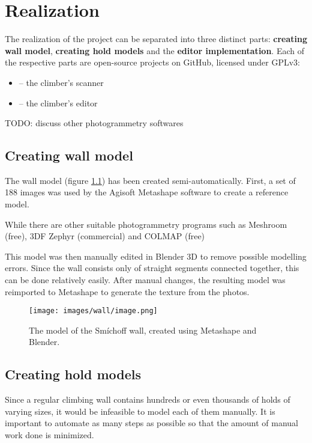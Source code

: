 \chapter{Realization}\label{sec:realization}

The realization of the project can be separated into three distinct parts: \textbf{creating wall model}, \textbf{creating hold models} and the \textbf{editor implementation}.
Each of the respective parts are open-source projects on GitHub, licensed under GPLv3:
\begin{itemize}
	\item \raisebox{-0.08em}{} -- the climber's scanner \cite{clis}
	\item \raisebox{-0.08em}{} -- the climber's editor \cite{cled}
\end{itemize}

TODO: discuss other photogrammetry softwares

\section{Creating wall model}
The wall model (figure \ref{fig:model}) has been created semi-automatically.
First, a set of 188 images was used by the Agisoft Metashape software to create a reference model.

While there are other suitable photogrammetry programs such as Meshroom (free), 3DF Zephyr (commercial) and COLMAP (free)

This model was then manually edited in Blender 3D to remove possible modelling errors.
Since the wall consists only of straight segments connected together, this can be done relatively easily.
After manual changes, the resulting model was reimported to Metashape to generate the texture from the photos.

\begin{figure}[H]
	\centering
	\texttt{[image: images/wall/image.png]}
	\caption{The model of the Smíchoff wall, created using Metashape and Blender.}
	\label{fig:model}
\end{figure}


\section{Creating hold models}
Since a regular climbing wall contains hundreds or even thousands of holds of varying sizes, it would be infeasible to model each of them manually.
It is important to automate as many steps as possible so that the amount of manual work done is minimized.

